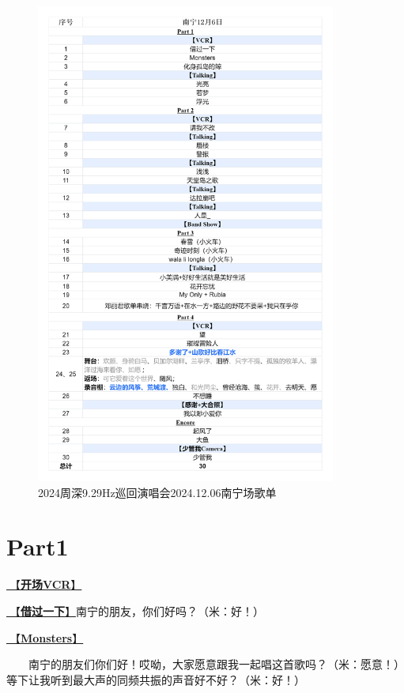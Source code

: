 \documentclass[]{ctexbook}
\begin{document}
\begin{figure}

{\centering \includegraphics[width=280pt]{img/playlists/playlists-nanning-20241206} 

}

\caption{2024周深9.29Hz巡回演唱会2024.12.06南宁场歌单}\label{fig:unnamed-chunk-150}
\end{figure}

\newpage

\section{Part1}\label{nanning-20241206-part1}

\hyperref[opening-vcr]{🎥【\textbf{开场VCR}】}

\hyperref[I-will-go-my-way]{🎵【\textbf{借过一下}】}南宁的朋友，你们好吗？（米：好！）

\hyperref[Monsters]{🎵【\textbf{Monsters}】}

  南宁的朋友们你们好！哎呦，大家愿意跟我一起唱这首歌吗？（米：愿意！）等下让我听到最大声的同频共振的声音好不好？（米：好！）
\end{document}
